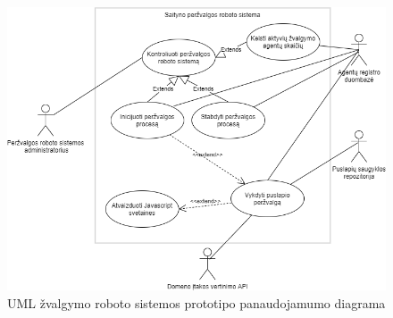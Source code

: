 \begin{figure}[htp!]
\centering
\includegraphics[scale=0.6]{img/Use_case_diagram.png}
\caption{UML žvalgymo roboto sistemos prototipo panaudojamumo diagrama}
\label{fig:use_case_diagram}
\end{figure}
